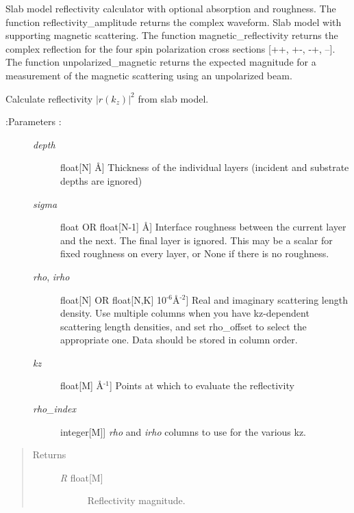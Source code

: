 \documentclass[letterpaper,10pt,english]{sphinxmanual}
\begin{document}
Slab model reflectivity calculator with optional absorption and roughness.
The function reflectivity\_amplitude returns the complex waveform.
Slab model with supporting magnetic scattering.  The function
magnetic\_reflectivity returns the complex reflection for the four
spin polarization cross sections {[}++, +-, -+, --{]}.  The function
unpolarized\_magnetic returns the expected magnitude for a measurement
of the magnetic scattering using an unpolarized beam.

\begin{fulllineitems}
\label{api/reflectivity:refl1d.reflectivity.reflectivity}
Calculate reflectivity $|r(k_z)|^2$ from slab model.
\begin{description}
\item[{:Parameters :}] \leavevmode\begin{description}
\item[{\emph{depth}}] \leavevmode{[}float{[}N{]} \textbar{} Å{]}
Thickness of the individual layers (incident and substrate
depths are ignored)

\item[{\emph{sigma}}] \leavevmode{[}float OR float{[}N-1{]} \textbar{} Å{]}
Interface roughness between the current layer and the next.
The final layer is ignored.  This may be a scalar for fixed
roughness on every layer, or None if there is no roughness.

\item[{\emph{rho}, \emph{irho}}] \leavevmode{[}float{[}N{]} OR float{[}N,K{]} \textbar{} 10$^{\text{-6}}$Å$^{\text{-2}}${]}
Real and imaginary scattering length density.  Use multiple
columns when you have kz-dependent scattering length densities,
and set rho\_offset to select the appropriate one.  Data should
be stored in column order.

\item[{\emph{kz}}] \leavevmode{[}float{[}M{]} \textbar{} Å$^{\text{-1}}${]}
Points at which to evaluate the reflectivity

\item[{\emph{rho\_index}}] \leavevmode{[}integer{[}M{]}{]}
\emph{rho} and \emph{irho} columns to use for the various kz.

\end{description}

\end{description}
\begin{quote}\begin{description}
\item[{Returns }] \leavevmode\begin{description}
\item[{\emph{R} \textbar{} float{[}M{]}}] \leavevmode
Reflectivity magnitude.


\end{description}
\end{description}
\end{quote}
\end{fulllineitems}
\end{document}
